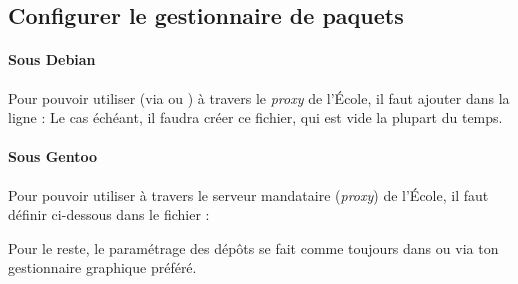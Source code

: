 \subsection{Configurer le gestionnaire de paquets}




\paragraph{Sous Debian}
\label{debian_mirror} Pour pouvoir utiliser  (via  ou ) à travers le \emph{proxy} de l'École, il faut ajouter dans  la ligne :
Le cas échéant, il faudra créer ce fichier, qui est vide la plupart du temps.

\paragraph{Sous Gentoo}
\label{gentoo_mirror} Pour pouvoir utiliser  à  travers le serveur mandataire (\emph{proxy}) de l'École, il faut définir %
ci-dessous dans le fichier  :



Pour le reste, le paramétrage des dépôts se fait comme toujours dans  ou via ton gestionnaire graphique préféré.
